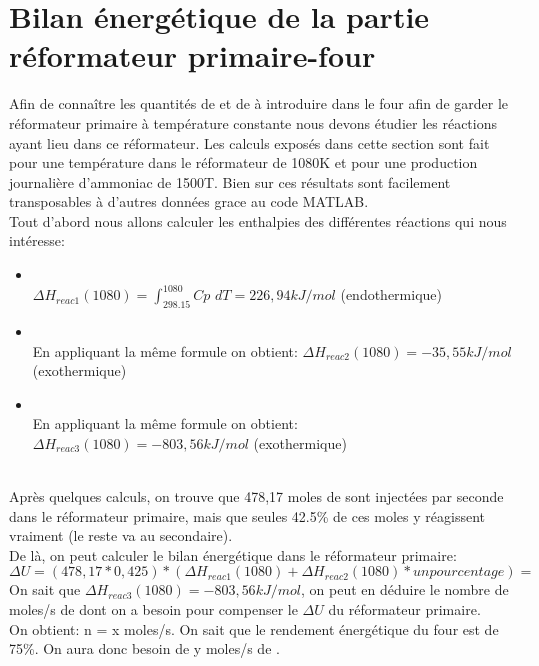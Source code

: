 \documentclass[a4paper, oneside, 12pt]{article}
\begin{document}
\section{Bilan énergétique de la partie réformateur primaire-four}

Afin de connaître les quantités de  et de  à introduire dans le four afin de garder le réformateur primaire à température constante nous devons étudier les réactions ayant lieu dans ce réformateur. Les calculs exposés dans cette section sont fait pour une température dans le réformateur de 1080K et pour une production journalière d'ammoniac de 1500T. Bien sur ces résultats sont facilement transposables à d'autres données grace au code MATLAB. \\
Tout d'abord nous allons calculer les enthalpies des différentes réactions qui nous intéresse: \\
\begin{itemize}
\item{ \\
$\Delta H_{reac1} (1080)=\int_{298.15}^{1080} Cp$ $dT = 226,94 kJ/mol$ (endothermique)}
\item{ \\
En appliquant la même formule on obtient: $\Delta H_{reac2} (1080) = -35,55 kJ/mol$ (exothermique)}
\item{ \\
En appliquant la même formule on obtient: $\Delta H_{reac3} (1080) = -803,56 kJ/mol$ (exothermique)}
\end{itemize}
\\
Après quelques calculs, on trouve que 478,17 moles de  sont injectées par seconde dans le réformateur primaire, mais que seules 42.5\% de ces moles y réagissent vraiment (le reste va au secondaire). \\
De là, on peut calculer le bilan énergétique dans le réformateur primaire: \\
$\Delta U = (478,17 * 0,425) * (\Delta H_{reac1} (1080) + \Delta H_{reac2} (1080) * un pourcentage) = $ \\
On sait que $\Delta H_{reac3} (1080) = -803,56 kJ/mol$, on peut en déduire le nombre de moles/s de  dont on a besoin pour compenser le $\Delta U$ du réformateur primaire. \\
On obtient: n = x moles/s.
On sait que le rendement énergétique du four est de 75\%.
On aura donc besoin de y moles/s de .
\end{document}

